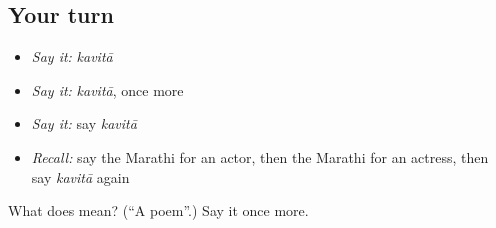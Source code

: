 \subsection*{Your turn}
\begin{itemize}
\raggedright
  \item \emph{Say it:} \emph{kavitā}
  \item \emph{Say it:} \emph{kavitā}, once more
  \item \emph{Say it:} say \emph{kavitā}
  \item \emph{Recall:} say the Marathi for an actor, then the Marathi for an actress, then say \emph{kavitā} again
\end{itemize}

\begin{tcolorbox}[breakable,colback=teal!4,colframe=teal!35!black,title={Before you move on}]
What does  mean? (\textquotedblleft{}A poem\textquotedblright{}.) Say it once more.
\end{tcolorbox}
